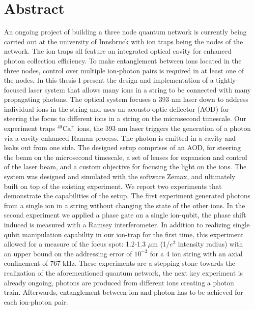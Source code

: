 \documentclass[english, a4paper, 12pt, twoside]{book}
\numberwithin{equation}{section} %
\begin{document}
{

}
\restoregeometry %

\thispagestyle{plain} %
\clearpage\mbox{}\clearpage %

\newpage

\section*{Abstract}
An ongoing project of building a three node quantum network is currently being carried out at the university of Innsbruck with ion traps being the nodes of the network. The ion traps all feature an integrated optical cavity for enhanced photon collection efficiency. To make entanglement between ions located in the three nodes, control over multiple ion-photon pairs is required in at least one of the nodes. In this thesis I present the design and implementation of a tightly-focused laser system that allows many ions in a string to be connected with many propagating photons. The optical system focuses a 393 nm laser down to address individual ions in the string and uses an acousto-optic deflector (AOD) for steering the focus to different ions in a string on the microsecond timescale. Our experiment traps $^{40}\text{Ca}^+$ ions, the 393 nm laser triggers the generation of a photon via a cavity enhanced Raman process. The photon is emitted in a cavity and leaks out from one side.
The designed setup comprises of an AOD, for steering the beam on the microsecond timescale, a set of lenses for expansion and control of the laser beam, and a custom objective for focusing the light on the ions. The system was designed and simulated with the software Zemax, and ultimately built on top of the existing experiment. We report two experiments that demonstrate the capabilities of the setup. The first experiment generated photons from a single ion in a string without changing the state of the other ions. In the second experiment we applied a phase gate on a single ion-qubit, the phase shift induced is measured with a Ramsey interferometer. In addition to realizing single qubit manipulation capability in our ion-trap for the first time, this experiment allowed for a measure of the focus spot: 1.2-1.3 $\mu$m (1/$e^2$ intensity radius) with an upper bound on the addressing error of $10^{-2}$ for a 4 ion string with an axial confinement of 767 kHz. These experiments are a stepping stone towards the realization of the aforementioned quantum network, the next key experiment is already ongoing, photons are produced from different ions creating a photon train. Afterwards, entanglement between ion and photon has to be achieved for each ion-photon pair.
\newpage
\end{document}
